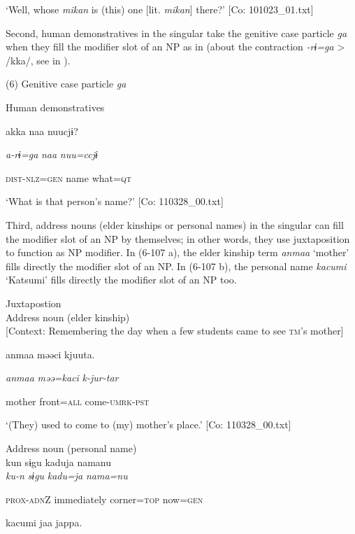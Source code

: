 \glt ‘Well, whose \textit{mikan} is (this) one [lit. \textit{mikan}] there?’ [Co: 101023\_01.txt]
\z

  Second, human demonstratives in the singular take the genitive case particle \textit{ga} when they fill the modifier slot of an NP as in  (about the contraction \textit{{}-rɨ=ga} > /kka/, see  in ).

(6)  Genitive case particle \textit{ga}

  Human demonstratives

{\TM}
\gll akka  naa  nuucjɨ?

    \textit{a-rɨ=ga}  \textit{naa}  \textit{nuu=ccjɨ}

    \textsc{dist}-\textsc{nlz}=\textsc{gen}  name  what=\textsc{qt}

\glt    ‘What is that person’s name?’ [Co: 110328\_00.txt]
\z

  Third, address nouns (elder kinships or personal names) in the singular can fill the modifier slot of an NP by themselves; in other words, they use juxtaposition to function as NP modifier. In (6-107 a), the elder kinship term \textit{anmaa} ‘mother’ fills directly the modifier slot of an NP. In (6-107 b), the personal name \textit{kacumi} ‘Katsumi’ fills directly the modifier slot of an NP too.

\ea\label{ex:6-107}
 Juxtapostion\\

 \ea Address noun (elder kinship)\\{}
[Context: Remembering the day when a few students came to see \textsc{tm}’s mother]

{\TM}
\gll anmaa  məəci  kjuuta.

      \textit{anmaa}  \textit{məə=kaci}  \textit{k-jur-tar}

      mother  front=\textsc{all}  come-\textsc{umrk}-\textsc{pst}

\glt ‘(They) used to come to (my) mother’s place.’ [Co: 110328\_00.txt]
\z

 \ex Address noun (personal name)\\
{\TM}
\gll  kun  sɨgu  kaduja  namanu\\

      \textit{ku-n}  \textit{sɨgu}  \textit{kadu=ja}  \textit{nama=nu}

      \textsc{prox}-\textsc{adn}Z  immediately  corner=\textsc{top}  now=\textsc{gen}

      kacumi  jaa  jappa.

